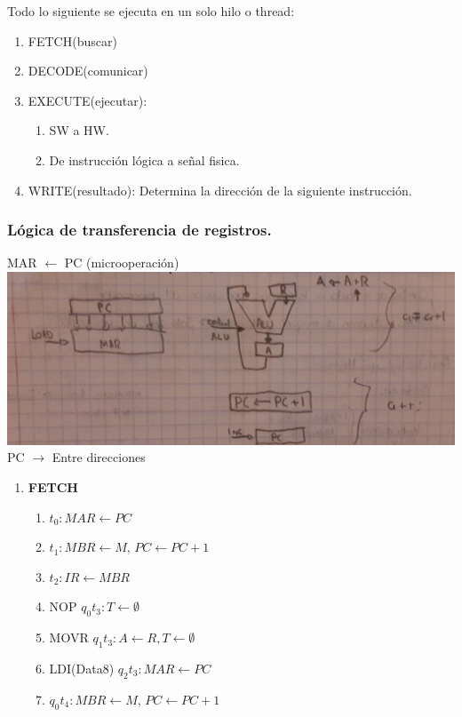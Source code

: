 \documentclass[12pt]{article}
\begin{document}
Todo lo siguiente se ejecuta en un solo hilo o thread:
\begin{enumerate}
    \item FETCH(buscar)
    \item DECODE(comunicar)
    \item EXECUTE(ejecutar):
    \begin{enumerate}
        \item SW a HW.
        \item De instrucción lógica a señal fisica.
    \end{enumerate}
    \item WRITE(resultado): Determina la dirección de la siguiente instrucción.
\end{enumerate}

{\color{blue} \subsubsection*{\textbf{Lógica de transferencia de registros.}}}
\vspace{1em}

MAR $\leftarrow$ PC (microoperación)\\

\includegraphics*[scale = 0.25]{images/esquema6.jpeg} PC $\rightarrow$ Entre direcciones\\

\begin{enumerate}
    \item \textbf{FETCH}
    \begin{enumerate}
        \item $t_0 : MAR \leftarrow PC$
        \item $t_1 : MBR \leftarrow M$, $PC \leftarrow PC+1$
        \item $t_2 : IR \leftarrow MBR$
        \item NOP $q_0t_3 : T \leftarrow \emptyset$
        \item MOVR $q_1t_3 : A \leftarrow R, T \leftarrow \emptyset$
        \item LDI(Data8) $q_2t_3 : MAR \leftarrow PC$
        \item $q_0t_4 : MBR \leftarrow M$, $PC \leftarrow PC+1$
    \end{enumerate}
\end{enumerate}
\vspace{1em}
\end{document}
